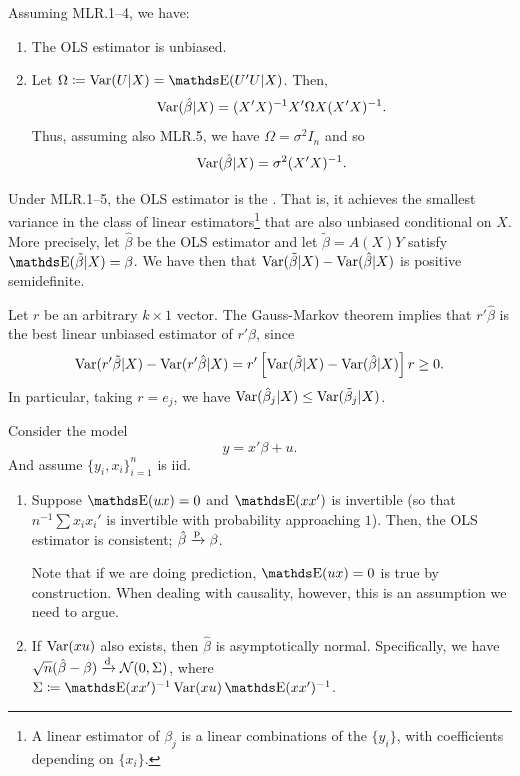 \begin{proposition}
  Assuming MLR.1--4, we have:
  \begin{enumerate}[label=(\roman*)]
    \item The OLS estimator is unbiased.
    \item Let \(\Omega \coloneqq \Var(U|X) = \E(U'U|X)\).
      Then,
      \[
        \operatorname{Var}(\hat{\beta} | X) = (X'X)^{-1} X' \Omega X (X'X)^{-1}.
      \]
      Thus, assuming also MLR.5, we have \(\Omega = \sigma^2 I_n\) and so
      \[
        \operatorname{Var}(\hat{\beta} | X) = \sigma^2 (X'X)^{-1}.
      \]
  \end{enumerate}
\end{proposition}

\begin{theorem}
  Under MLR.1--5, the OLS estimator is the .
  That is, it achieves the smallest variance in the class of linear estimators\footnote{A linear estimator of \(\beta_j\) is a linear combinations of the \(\{y_i\}\), with coefficients depending on \(\{x_i\}\).} that are also unbiased conditional on \(X\).
  More precisely, let \(\hat{\beta}\) be the OLS estimator and let \(\tilde{\beta} = A(X) Y\) satisfy \(\E(\tilde{\beta} | X) = \beta\).
  We have then that \(\operatorname{Var}(\tilde{\beta} | X) - \operatorname{Var}(\hat{\beta} | X)\) is positive semidefinite.
\end{theorem}

\begin{corollary}
  Let \(r\) be an arbitrary \(k \times 1\) vector.
  The Gauss-Markov theorem implies that \(r' \hat{\beta}\) is the best linear unbiased estimator of \(r' \beta\), since
  \[
    \operatorname{Var}(r' \tilde{\beta} | X) - \operatorname{Var}(r' \hat{\beta} | X)
    = r' \left[ \operatorname{Var}(\tilde{\beta} | X) - \operatorname{Var}(\hat{\beta} | X) \right] r
    \geq 0.
  \]
  In particular, taking \(r = e_j\), we have \(\operatorname{Var}(\hat{\beta}_j | X) \leq \operatorname{Var}(\tilde{\beta}_j | X)\).
\end{corollary}

\begin{proposition}
  Consider the model
  \[
    y = x' \beta + u.
  \]
  And assume \(\{y_i, x_i\}_{i = 1}^n\) is iid.
  \begin{enumerate}[label=(\roman*)]
    \item Suppose \(\E(ux) = 0\) and \(\E(xx')\) is invertible (so that \(n^{-1} \sum x_i x_i'\) is invertible with probability approaching \(1\)).
      Then, the OLS estimator is consistent; \(\hat{\beta} \xrightarrow{\mathrm{p}} \beta\).

      Note that if we are doing prediction, \(\E(ux) = 0\) is true by construction.
      When dealing with causality, however, this is an assumption we need to argue.
    \item If \(\operatorname{Var}(xu)\) also exists, then \(\hat{\beta}\) is asymptotically normal.
      Specifically, we have \(\sqrt{n}(\hat{\beta} - \beta) \xrightarrow{\mathrm{d}} \mathcal{N}(0, \Sigma)\), where \(\Sigma \coloneqq \E(xx')^{-1} \Var(xu) \E(xx')^{-1}\).
  \end{enumerate}
\end{proposition}

